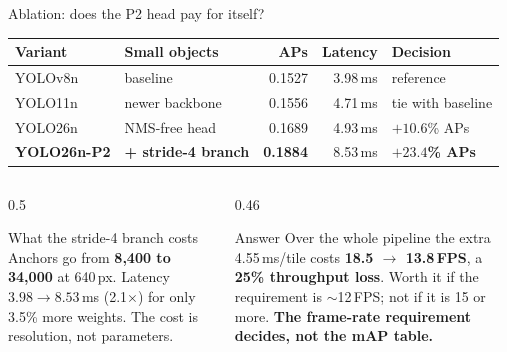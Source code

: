 \begin{frame}{Ablation: does the P2 head pay for itself?}
  \begin{center}
    \small
    \begin{tabular}{@{}llrrl@{}}
      \toprule
      \textbf{Variant} & \textbf{Small objects} & \textbf{APs} &
      \textbf{Latency} & \textbf{Decision} \\
      \midrule
      YOLOv8n     & baseline             & 0.1527 & 3.98\,ms & reference \\
      YOLO11n     & newer backbone       & 0.1556 & 4.71\,ms & tie with baseline \\
      YOLO26n     & NMS-free head        & 0.1689 & 4.93\,ms & $+10.6$\% APs \\
      \textbf{YOLO26n-P2} & \textbf{+ stride-4 branch} & \textbf{0.1884} &
        8.53\,ms & \textbf{$+23.4$\% APs} \\
      \bottomrule
    \end{tabular}
  \end{center}
  \vfill
  \begin{columns}[T,onlytextwidth]
    \begin{column}{0.5\textwidth}
      \begin{block}{What the stride-4 branch costs}
        \small
        Anchors go from \textbf{8{,}400 to 34{,}000} at 640\,px. Latency
        $3.98 \rightarrow 8.53$\,ms (2.1$\times$) for only 3.5\% more weights.
        The cost is resolution, not parameters.
      \end{block}
    \end{column}
    \begin{column}{0.46\textwidth}
      \begin{exampleblock}{Answer}
        \small
        Over the whole pipeline the extra 4.55\,ms/tile costs
        \textbf{18.5 $\rightarrow$ 13.8\,FPS}, a \textbf{25\% throughput loss}.
        Worth it if the requirement is $\sim$12\,FPS; not if it is 15 or more.
        \textbf{The frame-rate requirement decides, not the mAP table.}
      \end{exampleblock}
    \end{column}
  \end{columns}
\end{frame}


